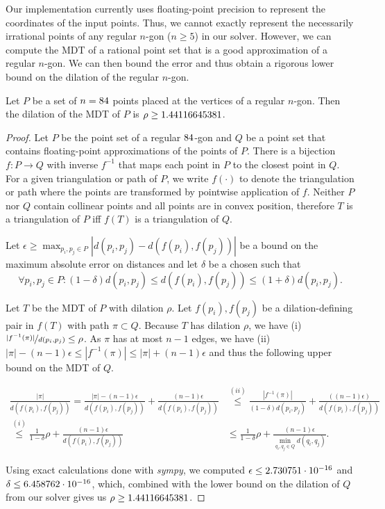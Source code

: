 Our implementation currently uses floating-point precision to represent the coordinates of the input points.
Thus, we cannot exactly represent the necessarily irrational points of any regular $n$-gon ($n \geq 5$) in our solver.
However, we can compute the MDT of a rational point set that is a good approximation of a regular $n$-gon.
We can then bound the error and thus obtain a rigorous lower bound on the dilation of the regular $n$-gon.
\begin{theorem}
    Let $P$ be a set of $n = 84$ points placed at the vertices of a regular $n$-gon.
    Then the dilation of the MDT of $P$ is $\rho \geq 1.44116645381$.
\end{theorem}
\begin{proof}
    Let $P$ be the point set of a regular $84$-gon and $Q$ be a point set that contains floating-point approximations of the points of $P$.
    There is a bijection $f: P \to Q$ with inverse $f^{-1}$ that maps each point in $P$ to the closest point in $Q$.
    For a given triangulation or path of $P$, we write $f(\cdot)$ to denote the triangulation or path where the points are transformed by pointwise application of $f$.
    Neither $P$ nor $Q$ contain collinear points and all points are in convex position,
    therefore $T$ is a triangulation of $P$ iff $f(T)$ is a triangulation of $Q$.

    Let $\epsilon \geq \max_{p_i, p_j\in P}|d(p_i,p_j)-d(f(p_i),f(p_j))|$ be a bound on the maximum absolute error on distances and let
    $\delta$ be a chosen such that \[\forall p_i,p_j \in P: (1-\delta)d(p_i, p_j) \leq d(f(p_i), f(p_j)) \leq (1+\delta)d(p_i,p_j).\]

    Let $T$ be the MDT of $P$ with dilation $\rho$.
    Let $f(p_i), f(p_j)$ be a dilation-defining pair in $f(T)$ with path $\pi \subset Q$. 
    Because $T$ has dilation $\rho$, we have (i) $\nicefrac{|f^{-1}(\pi)|}{d(p_i,p_j)} \leq \rho$.
    As $\pi$ has at most $n-1$ edges, we have (ii) $|\pi| - (n-1)\epsilon \leq |f^{-1}(\pi)| \leq |\pi| + (n-1)\epsilon$ and thus the following upper bound on the MDT of $Q$.

    \begin{align*}
        \frac{|\pi|}{d(f(p_i),f(p_j))} = 
        \frac{|\pi| - (n-1)\epsilon}{d(f(p_i), f(p_j))} + \frac{(n-1)\epsilon}{d(f(p_i), f(p_j))} 
        &\overset{(ii)}{\leq}
        \frac{|f^{-1}(\pi)|}{(1-\delta)d(p_i, p_j)} + \frac{((n-1)\epsilon)}{d(f(p_i), f(p_j))} \\
        \overset{(i)}{\leq} \frac{1}{1-\delta}\rho + \frac{(n-1)\epsilon}{d(f(p_i), f(p_j))}
        &\leq \frac{1}{1-\delta}\rho + \frac{(n-1)\epsilon}{\min_{q_i,q_j\in Q}d(q_i,q_j)}.
    \end{align*}
    
    Using exact calculations done with \emph{sympy}, we computed $\epsilon \leq 2.730751 \cdot 10^{-16} $ and $\delta \leq 6.458762 \cdot 10^{-16}$,
    which, combined with the lower bound on the dilation of $Q$ from our solver gives us $\rho \geq 1.44116645381$.
\end{proof}
